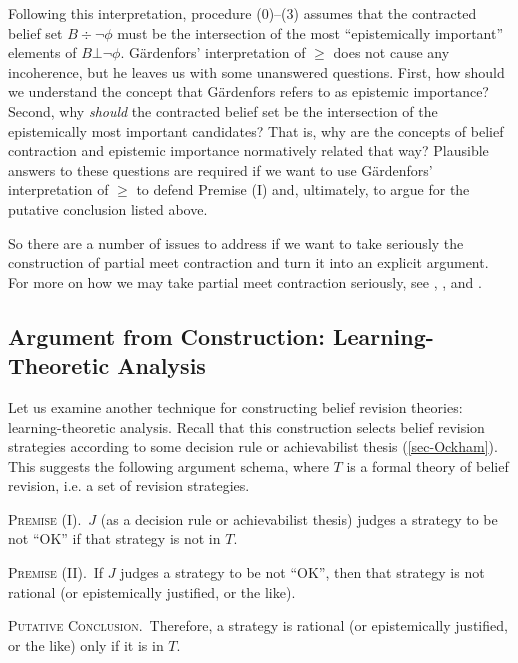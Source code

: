 \ed Following this interpretation, procedure ($0$)--($3$) assumes that the contracted belief set $B \div \neg\phi$ must be the intersection of the most ``epistemically important'' elements of $B\bot\neg\phi$. G\"{a}rdenfors' interpretation of $\ge$ does not cause any incoherence, but he leaves us with some unanswered questions. First, how should we understand the concept that G\"{a}rdenfors refers to as epistemic importance? Second, why {\em should} the contracted belief set be the intersection of the epistemically most important candidates? That is, why are the concepts of belief contraction and epistemic importance normatively related that way? Plausible answers to these questions are required if we want to use G\"{a}rdenfors' interpretation of $\ge$ to defend Premise (I) and, ultimately, to argue for the putative conclusion listed above.


So there are a number of issues to address if we want to take seriously the construction of partial meet contraction and turn it into an explicit argument. For more on how we may take partial meet contraction seriously, see \citet{gardenfors1984epistemic}, \citet{levi2004mild}, and \citet{arlo2006contraction}.


\subsection{Argument from Construction: Learning-Theoretic Analysis}\label{sec-arg-construction-2}



Let us examine another technique for constructing belief revision theories: learning-theoretic analysis. Recall that this construction selects belief revision strategies according to some decision rule or achievabilist thesis (\autoref{sec-Ockham}). This suggests the following argument schema, where $T$ is a formal theory of belief revision, i.e. a set of revision strategies.\op

	\xm \textsc{Premise (I).}\, $J$ (as a decision rule or achievabilist thesis) judges a strategy to be not ``OK'' if that strategy is not in $T$.

	\xm \textsc{Premise (II).}\, If $J$ judges a strategy to be not ``OK'', then that strategy is not rational (or epistemically justified, or the like).

	\xm \textsc{Putative Conclusion.}\, Therefore, a strategy is rational (or epistemically justified, or the like) only if it is in $T$.  

\ed 


